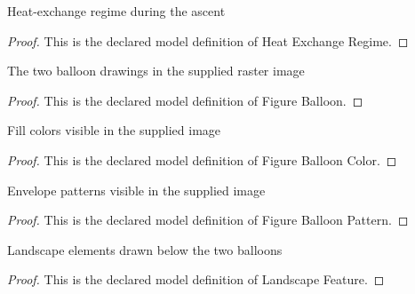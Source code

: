 \begin{definition}
  \label{def:physics:phyx-mini-0345:phyxminiproblems-problemphyxmini0345-heatexchangeregime}
  Heat-exchange regime during the ascent
\end{definition}
\begin{proof}
  This is the declared model definition of Heat Exchange Regime.
\end{proof}
\begin{definition}
  \label{def:physics:phyx-mini-0345:phyxminiproblems-problemphyxmini0345-figureballoon}
  The two balloon drawings in the supplied raster image
\end{definition}
\begin{proof}
  This is the declared model definition of Figure Balloon.
\end{proof}
\begin{definition}
  \label{def:physics:phyx-mini-0345:phyxminiproblems-problemphyxmini0345-figureballooncolor}
  Fill colors visible in the supplied image
\end{definition}
\begin{proof}
  This is the declared model definition of Figure Balloon Color.
\end{proof}
\begin{definition}
  \label{def:physics:phyx-mini-0345:phyxminiproblems-problemphyxmini0345-figureballoonpattern}
  Envelope patterns visible in the supplied image
\end{definition}
\begin{proof}
  This is the declared model definition of Figure Balloon Pattern.
\end{proof}
\begin{definition}
  \label{def:physics:phyx-mini-0345:phyxminiproblems-problemphyxmini0345-landscapefeature}
  Landscape elements drawn below the two balloons
\end{definition}
\begin{proof}
  This is the declared model definition of Landscape Feature.
\end{proof}

